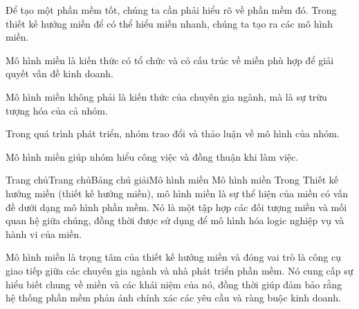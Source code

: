 
Để tạo một phần mềm tốt, chúng ta cần phải hiểu rõ về phần mềm đó. Trong thiết kế hướng miền để có thể hiểu miền nhanh, chúng ta tạo ra các mô hình miền.

Mô hình miền là kiến thức có tổ chức và có cấu trúc về miền phù hợp để giải quyết vấn đề kinh doanh.

Mô hình miền không phải là kiến thức của chuyên gia ngành, mà là sự trừu tượng hóa của cả nhóm.

Trong quá trình phát triển, nhóm trao đổi và thảo luận về mô hình của nhóm.

Mô hình miền giúp nhóm hiểu công việc và đồng thuận khi làm việc.





Trang chủTrang chủBảng chú giảiMô hình miền
Mô hình miền
Trong Thiết kế hướng miền (thiết kế hướng miền), mô hình miền là sự thể hiện của miền có vấn đề dưới dạng mô hình phần mềm. Nó là một tập hợp các đối tượng miền và mối quan hệ giữa chúng, đồng thời được sử dụng để mô hình hóa logic nghiệp vụ và hành vi của miền.

Mô hình miền là trọng tâm của thiết kế hướng miền và đóng vai trò là công cụ giao tiếp giữa các chuyên gia ngành và nhà phát triển phần mềm. Nó cung cấp sự hiểu biết chung về miền và các khái niệm của nó, đồng thời giúp đảm bảo rằng hệ thống phần mềm phản ánh chính xác các yêu cầu và ràng buộc kinh doanh.


